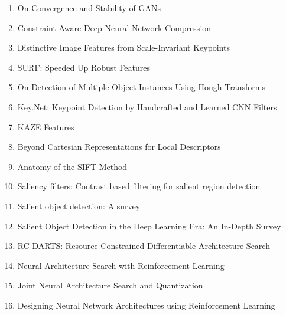 \documentclass[acmlarge]{acmart}
\begin{document}
\begin{enumerate}
	\item On Convergence and Stability of GANs \cite{Kodali2018OnCA} 

	\item Constraint-Aware Deep Neural Network Compression \cite{Chen2018ConstraintAwareDN} 

	\item Distinctive Image Features from Scale-Invariant Keypoints \cite{LoweDavid2004DistinctiveIF} 

	\item SURF: Speeded Up Robust Features \cite{Bay2006SURFSU} 

	\item On Detection of Multiple Object Instances Using Hough Transforms \cite{Barinova2010OnDO} 

	\item Key.Net: Keypoint Detection by Handcrafted and Learned CNN Filters \cite{Laguna2019KeyNetKD} 

	\item KAZE Features \cite{Alcantarilla2012KAZEF} 

	\item Beyond Cartesian Representations for Local Descriptors \cite{Ebel2019BeyondCR} 

	\item Anatomy of the SIFT Method \cite{ReyOtero2014AnatomyOT} 

	\item Saliency filters: Contrast based filtering for salient region detection \cite{Perazzi2012SaliencyFC} 

	\item Salient object detection: A survey \cite{Borji2019SalientOD} 

	\item Salient Object Detection in the Deep Learning Era: An In-Depth Survey \cite{Wang2019SalientOD} 

	\item RC-DARTS: Resource Constrained Differentiable Architecture Search \cite{Jin2019RCDARTSRC} 

	\item Neural Architecture Search with Reinforcement Learning \cite{Zoph2017NeuralAS} 

	\item Joint Neural Architecture Search and Quantization \cite{Chen2018JointNA} 

	\item Designing Neural Network Architectures using Reinforcement Learning \cite{Baker2017DesigningNN} 


\end{enumerate}
\end{document}
